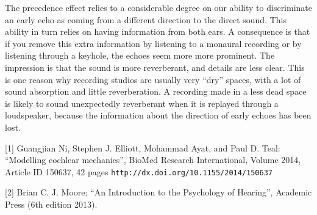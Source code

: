   The precedence effect relies to a considerable degree on our ability to 
  discriminate an early echo as coming from a different direction to the direct 
  sound. This ability in turn relies on having information from both ears. A 
  consequence is that if you remove this extra information by listening to a 
  monaural recording or by listening through a keyhole, the echoes seem more 
  more prominent. The impression is that the sound is more reverberant, and 
  details are less clear. This is one reason why recording studios are usually 
  very “dry” spaces, with a lot of sound absorption and little reverberation. A 
  recording made in a less dead space is likely to sound unexpectedly 
  reverberant when it is replayed through a loudspeaker, because the 
  information about the direction of early echoes has been lost. 



  \sectionreferences{}[1] Guangjian Ni, Stephen J. Elliott, Mohammad Ayat, and 
  Paul D. Teal: ``Modelling cochlear mechanics'', BioMed Research 
  International, Volume 2014, Article ID 150637, 42 pages 
  \tt{}http://dx.doi.org/10.1155/2014/150637\rm{} 

  [2] Brian C. J. Moore; ``An Introduction to the Psychology of Hearing'', 
  Academic Press (6th edition 2013). 